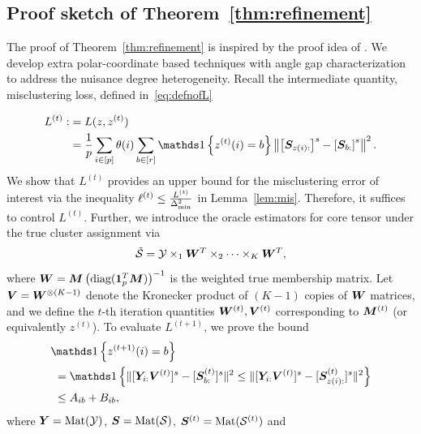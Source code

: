 \documentclass[journal]{IEEEtran}
\theoremstyle{definition}
\theoremstyle{definition}
\newcommand{\of}[1]{\left(#1\right)}
\newcommand{\off}[1]{\left[#1\right]}
\newcommand{\offf}[1]{\left\{#1\right\}}
\begin{document}
\subsection{Proof sketch of Theorem~\ref{thm:refinement}}\label{sec:thm5}
The proof of Theorem~\ref{thm:refinement} is inspired by the proof idea of \cite[Theorem 2]{han2020exact}. We develop extra polar-coordinate based techniques with angle gap characterization to address the nuisance degree heterogeneity. Recall the intermediate quantity, misclustering loss, defined in~\eqref{eq:defnofL}

\vspace{-0.5cm}
\small
\begin{align}
    L^{(t)} : &=L(z,z^{(t)})\\
    &= \frac{1}{p}  \sum_{i \in [p]} \theta(i) \sum_{b \in [r]}  \ind \offf{ z^{(t)}(i) = b } \onorm{ \off{ \mS_{ z(i):}  }^s - \off{ \mS_{b:}  }^s  }^2.
\end{align}
\normalsize
We show that $L^{(t)}$ provides an upper bound for the misclustering error of interest via the inequality $\ell^{(t)}\leq {L^{(t)}\over \Delta^2_{\min}}$ in Lemma~\ref{lem:mis}. Therefore, it suffices to control $L^{(t)}$. Further, we introduce the oracle estimators for core tensor under the true cluster assignment via 
\begin{equation}
    \tilde {\mathcal{S}} = \mathcal{Y} \times_1 \bm{W}^T \times_2 \cdots \times_K \bm{W}^T, 
\end{equation}
where $\mW = \mM \of{ \text{diag}(\mone_{p}^T \mM) }^{-1}$ is the weighted true membership matrix. Let $ \bm{V} = \bm{W}^{\otimes (K-1)}$ denote the Kronecker product of $(K-1)$ copies of $\bm{W}$ matrices, and we define the $t$-th iteration quantities $\bm{W}^{(t)}, \bm{V}^{(t)}$ corresponding to $\bm M^{(t)}$ (or equivalently $z^{(t)}$). To evaluate $L^{(t+1)}$, we prove the bound
\begin{align}
    &\ind \offf{ z^{(t+1)}(i) = b } \\
    &\ = \ind \offf{       \onormSize{}{ [ \mY_{i:} \mV^{(t)}  ]^s - [\mS_{b:}^{(t)}]^s }^2 \leq \onormSize{}{ [ \mY_{i:} \mV^{(t)}  ]^s - [\mS_{z(i):}^{(t)}]^s }^2}\\
    &\ \leq A_{ib} + B_{ib}, \label{eq:proof_5_event}
\end{align}
where $\bm Y = \text{Mat}(\mathcal{Y})$, $ \bm S = \text{Mat}(\mathcal{S})$, $\bm S^{(t)} = \text{Mat}(\mathcal{S}^{(t)})$ and
\end{document}

